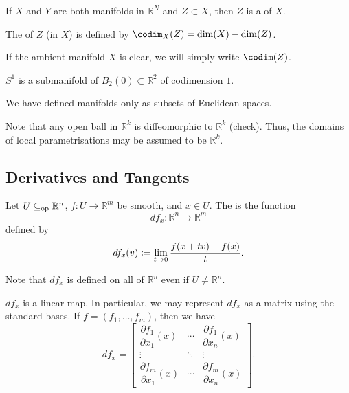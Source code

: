 \begin{defn}
	If $X$ and $Y$ are both manifolds in $\mathbb{R}^{N}$ and $Z \subset X$, then $Z$ is a  of $X$.

	The  of $Z$ (in $X$) is defined by $\codim_{X}(Z) = \dim(X) - \dim(Z)$.
\end{defn}
If the ambient manifold $X$ is clear, we will simply write $\codim(Z)$.

\begin{ex}
	$S^{1}$ is a submanifold of $B_{2}(0) \subset \mathbb{R}^{2}$ of codimension $1$.
\end{ex}

\begin{rem}
	We have defined manifolds only as subsets of Euclidean spaces.
\end{rem}

\begin{rem}
	Note that any open ball in $\mathbb{R}^{k}$ is diffeomorphic to $\mathbb{R}^{k}$ (check). Thus, the domains of local parametrisations may be assumed to be $\mathbb{R}^{k}$.
\end{rem}

\subsection{Derivatives and Tangents}

\begin{defn}
	Let $U \subseteq_{\operatorname{op}} \mathbb{R}^{n}$, $f : U \to \mathbb{R}^{m}$ be smooth, and $x \in U$. The  is the function
	\begin{equation*} 
		df_{x} : \mathbb{R}^{n} \to \mathbb{R}^{m}
	\end{equation*}
	defined by
	\begin{equation*} 
		df_{x}(v) \vcentcolon= \lim_{t \to 0} \frac{f(x + tv) - f(x)}{t}.
	\end{equation*}
\end{defn}
Note that $df_{x}$ is defined on all of $\mathbb{R}^{n}$ even if $U \neq \mathbb{R}^{n}$.

\begin{rem}
	$df_{x}$ is a linear map. In particular, we may represent $df_{x}$ as a matrix using the standard bases. If $f = (f_{1}, \ldots, f_{m})$, then we have
	\begin{equation*} 
		df_{x} = 
		\begin{bmatrix}
			\dfrac{\partial f_{1}}{\partial x_{1}}(x) & \cdots & \dfrac{\partial f_{1}}{\partial x_{n}}(x) \\
			\vdots & \ddots & \vdots \\
			\dfrac{\partial f_{m}}{\partial x_{1}}(x) & \cdots & \dfrac{\partial f_{m}}{\partial x_{n}}(x)
		\end{bmatrix}.
	\end{equation*}
\end{rem}

